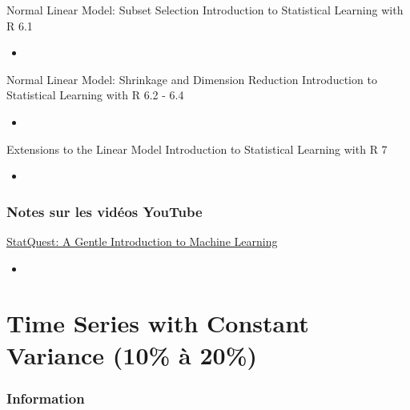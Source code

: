 \documentclass[12pt, titlepage, french]{report}
\begin{document}
\begin{CHPT_SUMM_AUTO_NUMB}[label = {L.-54}]{Normal Linear Model: Subset Selection}
Introduction to Statistical Learning with R 6.1
	\begin{itemize}
		\item	
	\end{itemize}
\end{CHPT_SUMM_AUTO_NUMB}

\begin{CHPT_SUMM_AUTO_NUMB}[label = {L.-55}]{Normal Linear Model: Shrinkage and Dimension Reduction}
Introduction to Statistical Learning with R 6.2 - 6.4
	\begin{itemize}
		\item	
	\end{itemize}
\end{CHPT_SUMM_AUTO_NUMB}

\begin{CHPT_SUMM_AUTO_NUMB}[label = {L.-56}]{Extensions to the Linear Model}
Introduction to Statistical Learning with R 7
	\begin{itemize}
		\item	
	\end{itemize}
\end{CHPT_SUMM_AUTO_NUMB}

\subsection{Notes sur les vidéos YouTube}

\begin{YTB_SUMM}[label = {SQ-BASICS-ML-INTRO}]{\href{https://www.youtube.com/watch?v=Gv9_4yMHFhI&list=PLblh5JKOoLUICTaGLRoHQDuF_7q2GfuJF&index=2&t=0s}{StatQuest: A Gentle Introduction to Machine Learning}}
\begin{itemize}
	\item	
\end{itemize}
\end{YTB_SUMM}

\newpage

\chapter[Time Series with Constant Variance]{Time Series with Constant Variance (10\% à 20\%)}

\subsection{Information}
\end{document}

